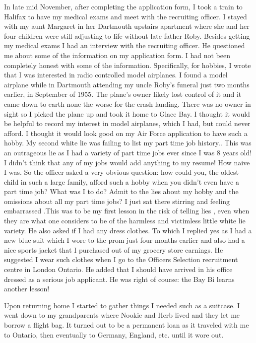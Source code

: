 In late mid November, after completing the application form, I took a train to Halifax to have my medical exams and meet with the recruiting officer. I stayed with my aunt Margaret in her Dartmouth upstairs apartment where she and her four children were still adjusting to life without late father Roby. Besides getting my medical exams I had an interview with the recruiting officer. He questioned me about some of the information on my application form. I had not been completely honest with some of the information. Specifically, for hobbies, I wrote that I was interested in radio controlled model airplanes. I found a model airplane while in Dartmouth attending my uncle Roby's funeral just two months earlier, in September of 1955. The plane's owner likely lost control of it and it came down to earth none the worse for the crash landing. There was no owner in sight so I picked the plane up and took it home to Glace Bay. I thought it would be helpful to record my interest in model airplanes, which I had, but could never afford. I thought it would look good on my Air Force application to have such a hobby. My second white lie was failing to list my part time job history.. This was an outrageous lie as I had a variety of part time jobs ever since I was 8 years old! I didn't think that any of my jobs would add anything to my resume! How naive I was. So the officer asked a very obvious question: how could you, the oldest child in such a large family, afford such a hobby when you didn't even have a part time job? What was I to do? Admit to the lies about my hobby and the omissions about all my part time jobs? I just sat there stirring and feeling embarrassed .This was to be my first lesson in the risk of telling lies , even when they are what one considers to be of the harmless and victimless little white lie variety. He also asked if I had any dress clothes. To which I replied yes as I had a new blue suit which I wore to the prom just four months earlier and also had a nice sports jacket that I purchased out of my grocery store earnings. He suggested I wear such clothes when I go to the Officers Selection recruitment centre in London Ontario. He added that I should have arrived in his office dressed as a serious job applicant. He was right of course: the Bay Bi learns another lesson!

Upon returning home I started to gather things I needed such as a suitcase. I went down to my grandparents where Nookie and Herb lived and they let me borrow a flight bag. It turned out to be a permanent loan as it traveled with me to Ontario, then eventually to Germany, England, etc. until it wore out.

